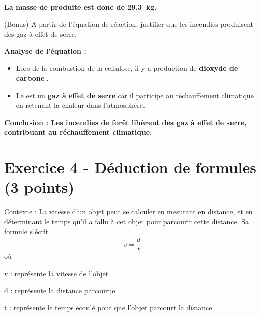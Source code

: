 \documentclass[answers]{exam}
\begin{document}
\begin{questions}
\begin{solution}
    \textbf{La masse de  produite est donc de \SI{29.3}{kg}.}
  \end{solution}

  \question[0.5] (Bonus) A partir de l'équation de réaction, justifier que les incendies produisent des gaz à effet de serre.
  \begin{solution}
    \textbf{Analyse de l'équation :}
    \begin{itemize}[noitemsep]
      \item Lors de la combustion de la cellulose, il y a production de \textbf{dioxyde de carbone} .
      \item Le  est un \textbf{gaz à effet de serre} car il participe au réchauffement climatique en retenant la chaleur dans l'atmosphère.
    \end{itemize}
    \textbf{Conclusion : Les incendies de forêt libèrent des gaz à effet de serre, contribuant au réchauffement climatique.}
  \end{solution}
\end{questions}


\section*{Exercice 4 - Déduction de formules (3 points)}

\begin{tcolorbox}[colback=gray!10!white, colframe=gray, title=Document 4 - La vitesse]
  Contexte : La vitesse d'un objet peut se calculer en mesurant en distance, et en déterminant le temps qu'il a fallu à cet objet pour parcourir cette distance. Sa formule s'écrit
  \[
  v = \frac{d}{t}
  \]
  où 

  \begin{addmargin}[4em]{1em}
    \begin{compactitem}
        \item [v]: représente la vitesse de l'objet
        \item [d]: représente la distance parcourue
        \item [t]: représente le temps écoulé pour que l'objet parcourt la distance
    \end{compactitem}
    \end{addmargin}
  \end{tcolorbox}
\end{document}
